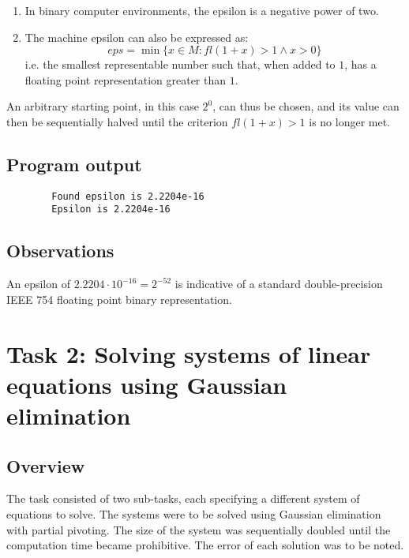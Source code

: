 \documentclass{article}
\begin{document}
	\begin{enumerate}
		\item In binary computer environments, the epsilon is a negative power
		of two.
		\item The machine epsilon can also be expressed as:
		\begin{equation}
			eps = \min\{x \in M: fl(1 + x) > 1 \land x > 0\}
		\end{equation}
		i.e. the smallest representable number such that, when added to $1$,
		has a floating point representation greater than $1$.
	\end{enumerate}
	
	An arbitrary starting point, in this case $2^0$, can thus be chosen, and its
	value can then be sequentially halved until the criterion $fl(1 + x) > 1$ is
	no longer met.
	
	\subsection{Program output}
	
	\begin{verbatim}
		Found epsilon is 2.2204e-16
		Epsilon is 2.2204e-16
	\end{verbatim}
	
	\subsection{Observations}
	
	An epsilon of $2.2204 \cdot 10^{-16} = 2^{-52}$ is indicative of a standard
	double-precision IEEE 754 floating point binary representation.
	
	\newpage
	
	\section{Task 2: Solving systems of linear equations using Gaussian
	elimination}
	
	\subsection{Overview}
	
	The task consisted of two sub-tasks, each specifying a different system
	of equations to solve. The systems were to be solved using Gaussian
	elimination with partial pivoting. The size of the system was sequentially
	doubled until the computation time became prohibitive. The error of each
	solution was to be noted.
	
\end{document}
